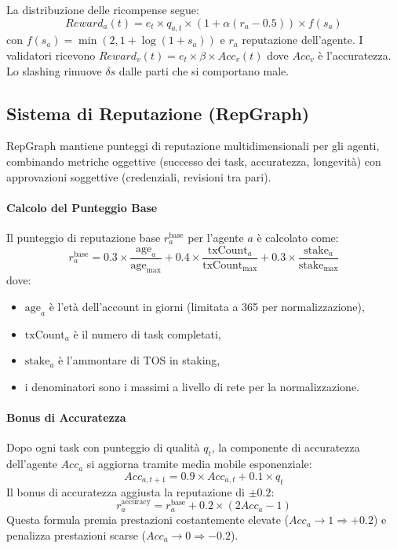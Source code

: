 \documentclass[11pt]{article}
\begin{document}
La distribuzione delle ricompense segue:
\begin{equation}
Reward_a(t) = e_t \times q_{a,t} \times \left(1 + \alpha (r_a - 0.5)\right) \times f(s_a)
\end{equation}
con $f(s_a) = \min(2, 1 + \log(1+s_a))$ e $r_a$ reputazione dell'agente. I validatori ricevono $Reward_v(t) = e_t \times \beta \times Acc_v(t)$ dove $Acc_v$ è l'accuratezza. Lo slashing rimuove $\delta s$ dalle parti che si comportano male.

\subsection{Sistema di Reputazione (RepGraph)}
\label{sec:reputation}
RepGraph mantiene punteggi di reputazione multidimensionali per gli agenti, combinando metriche oggettive (successo dei task, accuratezza, longevità) con approvazioni soggettive (credenziali, revisioni tra pari).

\paragraph{Calcolo del Punteggio Base} Il punteggio di reputazione base $r_a^{\text{base}}$ per l'agente $a$ è calcolato come:
\begin{equation}
r_a^{\text{base}} = 0.3 \times \frac{\text{age}_a}{\text{age}_{\max}} + 0.4 \times \frac{\text{txCount}_a}{\text{txCount}_{\max}} + 0.3 \times \frac{\text{stake}_a}{\text{stake}_{\max}}
\end{equation}
dove:
\begin{itemize}[noitemsep]
  \item $\text{age}_a$ è l'età dell'account in giorni (limitata a 365 per normalizzazione),
  \item $\text{txCount}_a$ è il numero di task completati,
  \item $\text{stake}_a$ è l'ammontare di TOS in staking,
  \item i denominatori sono i massimi a livello di rete per la normalizzazione.
\end{itemize}

\paragraph{Bonus di Accuratezza} Dopo ogni task con punteggio di qualità $q_t$, la componente di accuratezza dell'agente $Acc_a$ si aggiorna tramite media mobile esponenziale:
\begin{equation}
Acc_{a,t+1} = 0.9 \times Acc_{a,t} + 0.1 \times q_t
\end{equation}
Il bonus di accuratezza aggiusta la reputazione di $\pm 0.2$:
\begin{equation}
r_a^{\text{accuracy}} = r_a^{\text{base}} + 0.2 \times (2 Acc_a - 1)
\end{equation}
Questa formula premia prestazioni costantemente elevate ($Acc_a \to 1 \Rightarrow +0.2$) e penalizza prestazioni scarse ($Acc_a \to 0 \Rightarrow -0.2$).
\end{document}
